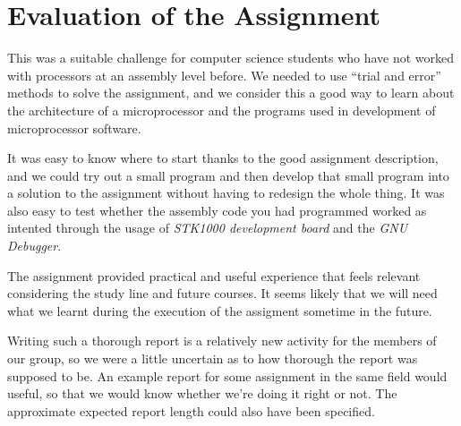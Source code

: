 \section{Evaluation of the Assignment}

This was a suitable challenge for computer science students who have not
worked with processors at an assembly level before. We needed to use ``trial and error'' methods to solve the assignment, and we
consider this a good way to learn about the architecture of a microprocessor
and the programs used in development of microprocessor software.

It was easy to know where to start thanks to the good assignment description, and we could try out a small
program and then develop that small program into a solution to the
assignment without having to redesign the whole thing. It was also easy
to test whether the assembly code you had programmed worked as intented
through the usage of {\em STK1000 development board} and the {\em GNU Debugger}.

The assignment provided practical and useful experience that feels
relevant considering the study line and future courses. It seems likely
that we will need what we learnt during the
execution of the assigment sometime in the future.

Writing such a thorough report is a relatively new activity for the members of our
group, so we were a little uncertain as to how thorough the report was
supposed to be. An example report for some assignment in the same field
would useful, so that we would know whether we're doing it
right or not. The approximate expected report length could also have been specified.